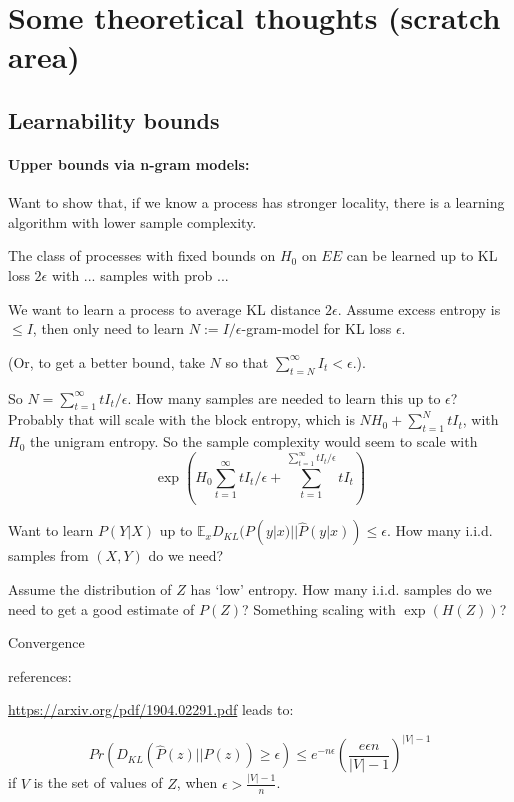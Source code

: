 


\section{Some theoretical thoughts (scratch area)}
\subsection{Learnability bounds}

\paragraph{Upper bounds via n-gram models:}
Want to show that, if we know a process has stronger locality, there is a learning algorithm with lower sample complexity.

\begin{thm}
The class of processes with fixed bounds on $H_0$ on $EE$ can be learned up to KL loss $2\epsilon$ with ... samples with prob ...
\end{thm}

We want to learn a process to average KL distance $2\epsilon$.
Assume excess entropy is $\leq I$, then only need to learn $N := I/\epsilon$-gram-model for KL loss $\epsilon$.

(Or, to get a better bound, take $N$ so that $\sum_{t=N}^\infty I_t < \epsilon$.).

So $N = \sum_{t=1}^\infty t I_t/\epsilon$.
How many samples are needed to learn this up to $\epsilon$? Probably that will scale with the block entropy, which is $N H_0 + \sum_{t=1}^N t I_t$, with $H_0$ the unigram entropy.
So the sample complexity would seem to scale with
$$\exp\left(H_0 \sum_{t=1}^\infty t I_t/\epsilon + \sum_{t=1}^{\sum_{t=1}^\infty t I_t/\epsilon} t I_t\right)$$


Want to learn $P(Y|X)$ up to $\mathbb{E}_x D_{KL}(P(y|x)||\hat P(y|x)) \leq \epsilon$.
How many i.i.d. samples from $(X,Y)$ do we need?

Assume the distribution of $Z$ has `low' entropy.
How many i.i.d. samples do we need to get a good estimate of $P(Z)$?
Something scaling with $\exp(H(Z))$?

Convergence

references:

\url{https://arxiv.org/pdf/1904.02291.pdf} leads to:

$$Pr(D_{KL}(\hat P(z)||P(z)) \geq \epsilon) \leq e^{-n\epsilon} \left(\frac{e\epsilon n}{|V|-1}\right)^{|V|-1}$$
if $V$ is the set of values of $Z$, when $\epsilon > \frac{|V|-1}{n}$.


